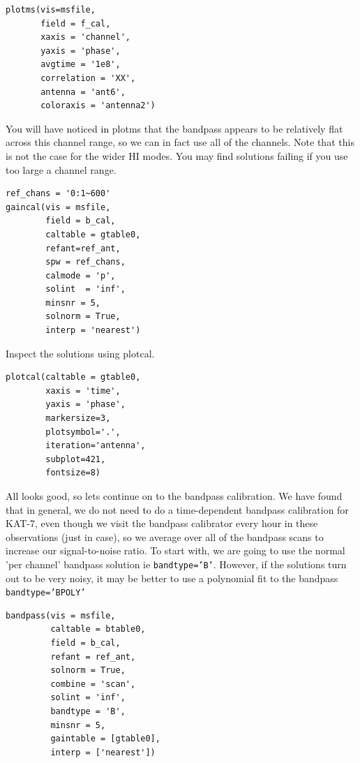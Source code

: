 \documentclass[force,almostfull,justified]{tufte-book}
\begin{document}
\begin{casacmd}
\begin{verbatim}
plotms(vis=msfile,
       field = f_cal,
       xaxis = 'channel',
       yaxis = 'phase',
       avgtime = '1e8',
       correlation = 'XX',
       antenna = 'ant6',
       coloraxis = 'antenna2')
\end{verbatim}
\end{casacmd}

You will have noticed in plotms that the bandpass appears to be relatively flat across this channel
range, so we can in fact use all of the channels.  Note that this is not the case for the wider HI
modes.  You may find solutions failing if you use too large a channel range.

\begin{casacmd}
\begin{verbatim}
ref_chans = '0:1~600'
gaincal(vis = msfile,
        field = b_cal,
        caltable = gtable0,
        refant=ref_ant,
        spw = ref_chans,
        calmode = 'p',
        solint  = 'inf',
        minsnr = 5,
        solnorm = True,
        interp = 'nearest')
\end{verbatim}
\end{casacmd}

Inspect the solutions using plotcal.

\begin{casacmd}
\begin{verbatim}
plotcal(caltable = gtable0,
        xaxis = 'time',
        yaxis = 'phase',
        markersize=3,
        plotsymbol='.',
        iteration='antenna',
        subplot=421,
        fontsize=8)
\end{verbatim}
\end{casacmd}

All looks good, so lets continue on to the bandpass calibration. We have found that in general, we do
not need to do a time-dependent bandpass calibration for KAT-7, even though we visit the bandpass
calibrator every hour in these observations (just in case), so we average over all of the bandpass
scans to increase our signal-to-noise ratio.  To start with, we are going to use the normal 'per
channel' bandpass solution ie {\tt bandtype='B'}. However, if the solutions turn out to be very noisy,
it may be better to use a polynomial fit to the bandpass {\tt bandtype='BPOLY'}

\begin{casacmd}
\begin{verbatim}
bandpass(vis = msfile,
         caltable = btable0,
         field = b_cal,
         refant = ref_ant, 
         solnorm = True,
         combine = 'scan',
         solint = 'inf', 
         bandtype = 'B',
         minsnr = 5,
         gaintable = [gtable0],
         interp = ['nearest'])
\end{verbatim}
\end{casacmd}
\end{document}
